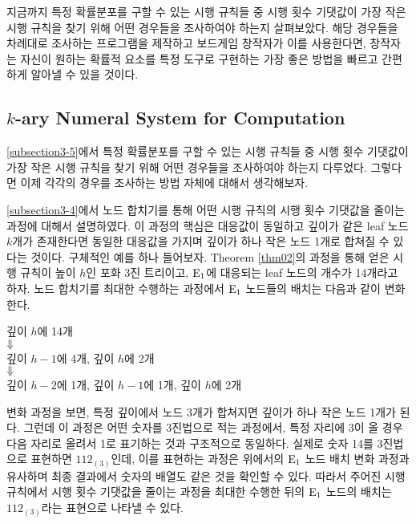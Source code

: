 \documentclass[11pt]{article}
\begin{document}
지금까지 특정 확률분포를 구할 수 있는 시행 규칙들 중 시행 횟수 기댓값이 가장 작은 시행 규칙을 찾기 위해 어떤 경우들을 조사하여야 하는지 살펴보았다. 해당 경우들을 차례대로 조사하는 프로그램을 제작하고 보드게임 창작자가 이를 사용한다면, 창작자는 자신이 원하는 확률적 요소를 특정 도구로 구현하는 가장 좋은 방법을 빠르고 간편하게 알아낼 수 있을 것이다.

\subsection{$k$-ary Numeral System for Computation}
\ref{subsection3-5}에서 특정 확률분포를 구할 수 있는 시행 규칙들 중 시행 횟수 기댓값이 가장 작은 시행 규칙을 찾기 위해 어떤 경우들을 조사하여야 하는지 다루었다. 그렇다면 이제 각각의 경우를 조사하는 방법 자체에 대해서 생각해보자.

\ref{subsection3-4}에서 노드 합치기를 통해 어떤 시행 규칙의 시행 횟수 기댓값을 줄이는 과정에 대해서 설명하였다. 이 과정의 핵심은 대응값이 동일하고 깊이가 같은 leaf 노드 $k$개가 존재한다면 동일한 대응값을 가지며 깊이가 하나 작은 노드 1개로 합쳐질 수 있다는 것이다. 구체적인 예를 하나 들어보자. Theorem \ref{thm02}의 과정을 통해 얻은 시행 규칙이 높이 $h$인 포화 3진 트리이고, $\textnormal{E}_{1}$에 대응되는 leaf 노드의 개수가 14개라고 하자. 노드 합치기를 최대한 수행하는 과정에서 $\textnormal{E}_{1}$ 노드들의 배치는 다음과 같이 변화한다.

\begin{center}
깊이 $h$에 14개\\
$\Large \Downarrow$ \\
깊이 $h-1$에 4개, 깊이 $h$에 2개\\
$\Large \Downarrow$ \\
깊이 $h-2$에 1개, 깊이 $h-1$에 1개, 깊이 $h$에 2개
\end{center}
\doublespacing

변화 과정을 보면, 특정 깊이에서 노드 3개가 합쳐지면 깊이가 하나 작은 노드 1개가 된다. 그런데 이 과정은 어떤 숫자를 3진법으로 적는 과정에서, 특정 자리에 3이 올 경우 다음 자리로 올려서 1로 표기하는 것과 구조적으로 동일하다. 실제로 숫자 14를 3진법으로 표현하면 $112_{(3)}$인데, 이를 표현하는 과정은 위에서의 $\textnormal{E}_{1}$ 노드 배치 변화 과정과 유사하며 최종 결과에서 숫자의 배열도 같은 것을 확인할 수 있다. 따라서 주어진 시행 규칙에서 시행 횟수 기댓값을 줄이는 과정을 최대한 수행한 뒤의 $\textnormal{E}_{1}$ 노드의 배치는 $112_{(3)}$라는 표현으로 나타낼 수 있다.
\end{document}
